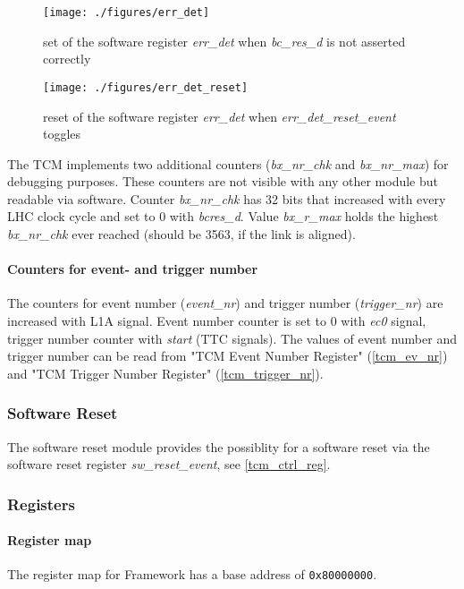 \begin{figure}[ht]
  \texttt{[image: ./figures/err\_det]}
  \caption{set of the software register \textit{err\_det} when \textit{bc\_res\_d} is not asserted correctly}
  \label{fig:err_det}
\end{figure}

\begin{figure}[ht]
  \texttt{[image: ./figures/err\_det\_reset]}
  \caption{reset of the software register \textit{err\_det} when \textit{err\_det\_reset\_event} toggles}
  \label{fig:err_det_reset}
\end{figure}

The TCM implements two additional counters (\textit{bx\_nr\_chk} and \textit{bx\_nr\_max}) for debugging purposes. These counters are not visible with any other module but readable via software. Counter \textit{bx\_nr\_chk} has 32 bits that increased with every LHC clock cycle and set to 0 with \textit{bcres\_d}. Value \textit{bx\_r\_max} holds the highest \textit{bx\_nr\_chk} ever reached (should be 3563, if the link is aligned).

\paragraph{Counters for event- and trigger number}
The counters for event number (\textit{event\_nr}) and trigger number (\textit{trigger\_nr}) are increased with L1A signal. Event number counter is set to 0 with \textit{ec0} signal, trigger number counter with \textit{start} (TTC signals). The values of event number and trigger number can be read from "TCM Event Number Register" (\ref{tcm_ev_nr}) and "TCM Trigger Number Register" (\ref{tcm_trigger_nr}).

\subsubsection{Software Reset} \label{sec:framework:software_reset}
The software reset module provides the possiblity for a software reset via the software reset register \textit{sw\_reset\_event}, see \ref{tcm_ctrl_reg}.

\subsubsection{Registers}
\label{sec:framework:registers}

\paragraph{Register map}
\label{sec:framework:reg_map}
The register map for Framework has a base address of \verb|0x80000000|.

